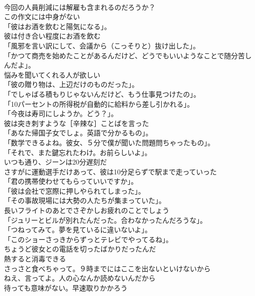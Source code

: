 \documentclass[8pt]{extreport}
\begin{document}
\begin{CJK}{UTF8}{min}
\\	今回の人員削減には解雇も含まれるのだろうか？	
\\	この作文には中身がない	
\\	「彼はお酒を飲むと陽気になる」。	
\\	彼は付き合い程度にお酒を飲む	
\\	「風邪を言い訳にして、会議から（こっそりと）抜け出した」。	
\\	「かつて商売を始めたことがあるんだけど、どうでもいいようなことで随分苦しんだよ」。	
\\	悩みを聞いてくれる人が欲しい	
\\	「彼の贈り物は、上辺だけのものだった」。	
\\	「でしゃばる積もりじゃないんだけど、もう仕事見つけたの」。	
\\	「10パーセントの所得税が自動的に給料から差し引かれる」。	
\\	「今夜は寿司にしようか。どう？」。	
\\	彼は突き刺すような［辛辣な］ことばを言った	
\\	「あなた帰国子女でしょ。英語で分かるもの」。	
\\	「数学できるよね。彼女、５分で僕が聞いた問題問ちゃったもの」。	
\\	「それで、また鍵忘れたわけ。お前らしいよ」。	
\\	いつも通り、ジーンは20分遅刻だ	
\\	さすがに運動選手だけあって、彼は10分足らずで駅まで走っていった	
\\	「君の携帯使わせてもらっていいですか」。	
\\	「彼は会社で窓際に押しやられてしまった」。	
\\	「その事故現場には大勢の人たちが集まっていた」。	
\\	長いフライトのあとでさぞかしお疲れのことでしょう	
\\	「ジュリーとビルが別れたんだった。合わなかったんだろうな」。	
\\	「つねってみて。夢を見ているに違いないよ」。	
\\	「このショーさっきからずっとテレビでやってるね」。	
\\	ちょうど彼女との電話を切ったばかりだったんだ	
\\	熱すると消毒できる	
\\	さっさと食べちゃって。９時までにはここを出ないといけないから	
\\	ねえ、言ってよ。人の心なんか読めないんだから	
\\	待っても意味がない。早速取りかかろう	

\end{CJK}
\end{document}
